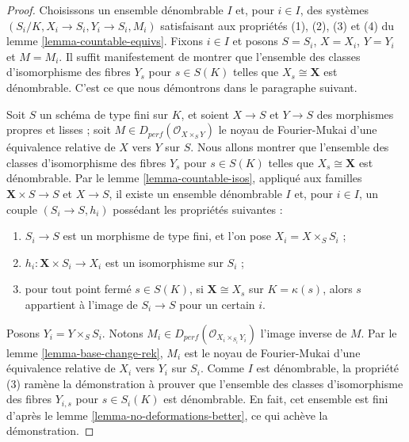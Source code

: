 \begin{proof}
Choisissons un ensemble dénombrable $I$ et, pour $i \in I$, des systèmes
$(S_i/K, X_i \to S_i, Y_i \to S_i, M_i)$ satisfaisant aux propriétés
(1), (2), (3) et (4) du lemme \ref{lemma-countable-equivs}.
Fixons $i \in I$ et posons $S = S_i$, $X = X_i$, $Y = Y_i$ et
$M = M_i$. Il suffit manifestement de montrer que
l'ensemble des classes d'isomorphisme des fibres $Y_s$ pour $s \in S(K)$
telles que $X_s \cong \mathbf{X}$ est dénombrable.
C'est ce que nous démontrons dans le paragraphe suivant.

\medskip\noindent
Soit $S$ un schéma de type fini sur $K$, et soient $X \to S$ et $Y \to S$
des morphismes propres et lisses ; soit $M \in D_{perf}(\mathcal{O}_{X \times_S Y})$
le noyau de Fourier-Mukai d'une équivalence relative de $X$
vers $Y$ sur $S$. Nous allons montrer que
l'ensemble des classes d'isomorphisme des fibres $Y_s$ pour $s \in S(K)$
telles que $X_s \cong \mathbf{X}$ est dénombrable.
Par le lemme \ref{lemma-countable-isos}, appliqué
aux familles $\mathbf{X} \times S \to S$ et $X \to S$,
il existe un ensemble dénombrable $I$ et, pour $i \in I$, un couple
$(S_i \to S, h_i)$ possédant les propriétés suivantes :
\begin{enumerate}
\item $S_i \to S$ est un morphisme de type fini, et l'on pose
$X_i = X \times_S S_i$ ;
\item $h_i : \mathbf{X} \times S_i \to X_i$
est un isomorphisme sur $S_i$ ;
\item pour tout point fermé $s \in S(K)$, si $\mathbf{X} \cong X_s$
sur $K = \kappa(s)$, alors $s$ appartient à l'image de $S_i \to S$
pour un certain $i$.
\end{enumerate}
Posons $Y_i = Y \times_S S_i$. Notons
$M_i \in D_{perf}(\mathcal{O}_{X_i \times_{S_i} Y_i})$
l'image inverse de $M$. Par le lemme \ref{lemma-base-change-rek},
$M_i$ est le noyau de Fourier-Mukai d'une équivalence relative de
$X_i$ vers $Y_i$ sur $S_i$. Comme $I$ est dénombrable, la
propriété (3) ramène la démonstration à prouver que
l'ensemble des classes d'isomorphisme des fibres $Y_{i, s}$ pour $s \in S_i(K)$
est dénombrable.
En fait, cet ensemble est fini d'après
le lemme \ref{lemma-no-deformations-better},
ce qui achève la démonstration.
\end{proof}














